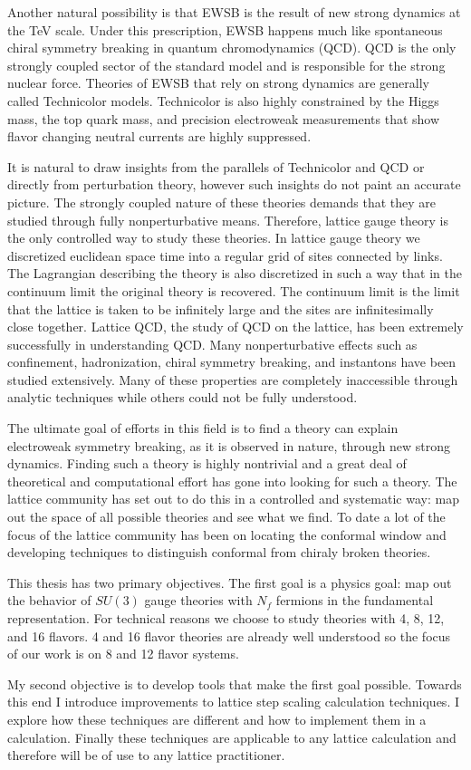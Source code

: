 Another natural possibility is that EWSB is the result of new strong dynamics at the TeV scale.
Under this prescription, EWSB happens much like spontaneous chiral symmetry breaking in quantum chromodynamics (QCD).
QCD is the only strongly coupled sector of the standard model and is responsible for the strong nuclear force.
Theories of EWSB that rely on strong dynamics are generally called Technicolor models.
Technicolor is also highly constrained by the Higgs mass, the top quark mass, and precision electroweak measurements that show flavor changing neutral currents are highly suppressed.

It is natural to draw insights from the parallels of Technicolor and QCD or directly from perturbation theory, however such insights do not paint an accurate picture.
The strongly coupled nature of these theories demands that they are studied through fully nonperturbative means.
Therefore, lattice gauge theory is the only controlled way to study these theories.
In lattice gauge theory we discretized euclidean space time into a regular grid of sites connected by links.
The Lagrangian describing the theory is also discretized in such a way that in the continuum limit the original theory is recovered.
The continuum limit is the limit that the lattice is taken to be infinitely large and the sites are infinitesimally close together.
Lattice QCD, the study of QCD on the lattice, has been extremely successfully in understanding QCD.
Many nonperturbative effects such as confinement, hadronization, chiral symmetry breaking, and instantons have been studied extensively.
Many of these properties are completely inaccessible through analytic techniques while others could not be fully understood.

The ultimate goal of efforts in this field is to find a theory can explain electroweak symmetry breaking, as it is observed in nature, through new strong dynamics.
Finding such a theory is highly nontrivial and a great deal of theoretical and computational effort has gone into looking for such a theory.
The lattice community has set out to do this in a controlled and systematic way: map out the space of all possible theories and see what we find.
To date a lot of the focus of the lattice community has been on locating the conformal window and developing techniques to distinguish conformal from chiraly broken theories.

This thesis has two primary objectives.
The first goal is a physics goal:  map out the behavior of $SU(3)$ gauge theories with $N_f$ fermions in the fundamental representation.
For technical reasons we choose to study theories with 4, 8, 12, and 16 flavors.
4 and 16 flavor theories are already well understood so the focus of our work is on 8 and 12 flavor systems.

My second objective is to develop tools that make the first goal possible.
Towards this end I introduce improvements to lattice step scaling calculation techniques.
I explore how these techniques are different and how to implement them in a calculation.
Finally these techniques are applicable to any lattice calculation and therefore will be of use to any lattice practitioner.
